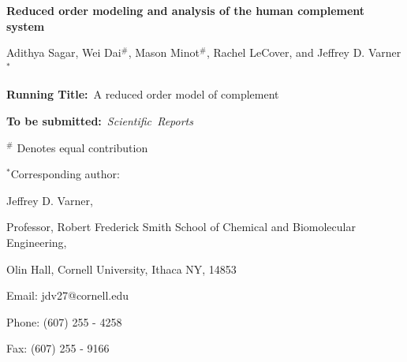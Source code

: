 \documentclass[12pt]{article}
\begin{document}
\begin{titlepage}
{\par\centering\textbf{\Large {Reduced order modeling and analysis of the human complement system}}}
\vspace{0.05in}
{\par \centering \large{Adithya Sagar, Wei Dai$^{\#}$, Mason Minot$^{\#}$, Rachel LeCover, and Jeffrey D. Varner$^{*}$}}
\vspace{0.10in}
{\par {}}
{\par {}}
\vspace{0.1in}
{\par \centering \textbf{Running Title:}~A reduced order model of complement}
\vspace{0.1in}
{\par \centering \textbf{To be submitted:}~\emph{Scientific~Reports}}
\vspace{0.5in}
{\par \centering $^{\#}$ Denotes equal contribution}
\vspace{0.1in}
{\par \centering $^{*}$Corresponding author:}
{\par \centering Jeffrey D. Varner,}
{\par \centering Professor, Robert Frederick Smith School of Chemical and Biomolecular Engineering,}
{\par {} Olin Hall, Cornell University, Ithaca NY, 14853}
{\par \centering Email: jdv27@cornell.edu}
{\par \centering Phone: (607) 255 - 4258}
{\par \centering Fax: (607) 255 - 9166}
\end{titlepage}
\date{}
\thispagestyle{empty}
\pagebreak
\end{document}
